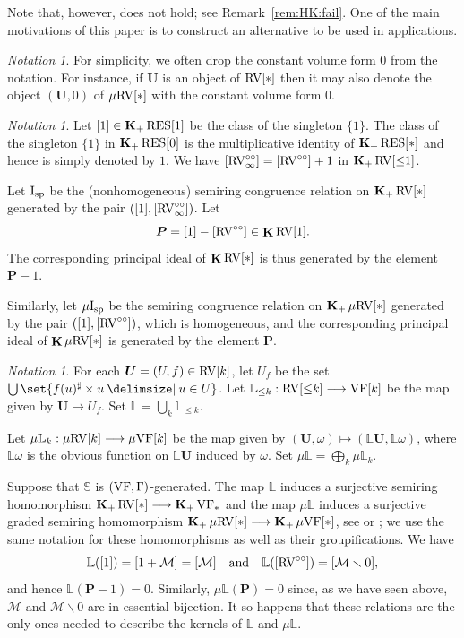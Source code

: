 \documentclass[12pt]{amsart}
\theoremstyle{plain}
\theoremstyle{definition}
\theoremstyle{remark}
\newtheorem{nota}[thm]{Notation}
\numberwithin{equation}{section}
\theoremstyle{plain}
\newcommand{\VF}{\textup{VF}}
\newcommand{\RV}{\textup{RV}}
\newcommand{\MM}{\mdl M}
\newcommand{\dand}{\quad \text{and} \quad}
\newcommand{\0}{\emptyset}
\newcommand{\mdl}[1]{\mathcal{#1}}  %
\newcommand{\bb}[1]{\mathbb{#1}}
\newcommand{\fun}{\longrightarrow}
\newcommand{\efun}{\longmapsto}
\newcommand{\mi}{\smallsetminus}
\providecommand\given{}
\newcommand\SetSymbol[1][]{%
\nonscript \: #1 \vert
\allowbreak
\nonscript\:
\mathopen{}}
\renewcommand\given{\SetSymbol[\delimsize]}
\newcommand{\mgVF}{{\mu} {\VF}}
\newcommand{\mgRV}{{\mu}{\RV}}
\newcommand{\RES}{\textup{RES}}
\newcommand{\isp}{\textup{I}_{\textup{sp}}}
\newcommand{\mgisp}{\mu \isp}
\newcommand{\mgL}{{\mu}{\bb L}}
\DeclareMathOperator{\gsk}{\mathbf{K}_+}
\DeclareMathOperator{\ggk}{\mathbf{K}}
\newcommand{\ccirc}{\circ \circ}
\begin{document}
Note that, however, \cite[Proposition~10.10(2)]{hrushovski:kazhdan:integration:vf} does not hold; see Remark~\ref{rem:HK:fail}. One of the main motivations of this paper is to construct an alternative to be used in applications.

\begin{nota}\label{drop:0}
For simplicity, we often drop the constant volume form $0$ from the notation. For instance, if $\bm U$ is an object of $\RV[*]$ then it may also denote the  object $(\bm U, 0)$ of $\mgRV[*]$ with the constant volume form $0$.
\end{nota}

\begin{nota}
Let $[1] \in \gsk \RES[1]$ be the class of the singleton $\{1\}$. The class of the singleton $\{1\}$ in $\gsk \RES[0]$ is the multiplicative identity of $\gsk \RES[*]$ and hence is simply denoted by $1$. We have $[\RV^{\circ\circ}_\infty] = [\RV^{\circ\circ}] + 1$ in $\gsk \RV[{\leq} 1]$.

Let $\isp$ be the (nonhomogeneous) semiring congruence relation on $\gsk \RV[*]$ generated by the pair $([1], [\RV^{\circ\circ}_\infty])$. Let
\[
\bm P = [1]-[\RV^{\ccirc}]  \in \ggk \RV[1].
\]
The corresponding principal ideal of $\ggk \RV[*]$ is thus generated by the element $\bm P - 1$.


Similarly, let $\mgisp$ be the  semiring congruence relation on $\gsk \mgRV[*]$ generated by the pair $([1], [\RV^{\circ\circ}])$, which is homogeneous, and the corresponding principal ideal of $\ggk \mgRV[*]$ is generated by the element $\bm P$.
\end{nota}


\begin{nota}\label{RVcat:tag}
For each  $\bm U = (U, f) \in  \RV[k]$, let $U_f$ be the set $\bigcup \set{f(u)^\sharp \times u \given u \in U}$. Let $\mathbb{L}_{\leq k}: \RV[{\leq}k] \fun \VF[k]$ be the map  given by $\bm U \efun U_f$. Set $\bb L = \bigcup_k \bb L_{\leq k}$.

Let $\mgL_k: \mgRV[k] \fun \mgVF[k]$ be the map given by $(\bm U, \omega) \efun (\bb L \bm U, \bb L \omega)$, where $\bb L \omega$ is the obvious function on $\bb L \bm U$ induced by $\omega$. Set $\mgL = \bigoplus_k \mgL_{k}$.
\end{nota}

Suppose that $\mathbb S$ is $(\VF,\Gamma)$-generated. The map $\bb L$ induces a surjective semiring homomorphism $\gsk \RV[*] \fun \gsk \VF_*$ and the map $\mgL$ induces a surjective graded semiring homomorphism $\gsk \mgRV[*] \fun \gsk \mgVF[*]$, see \cite[\S~4, \S~6]{hrushovski:kazhdan:integration:vf} or \cite[Corollaries~7.7, 10.6]{Yin:special:trans}; we use the same notation for these homomorphisms as well as their groupifications. We have
\[
\bb L ([1]) = [1 + \MM] = [\MM] \dand \bb L ([\RV^{\circ\circ}])=[\MM \mi 0],
\]
and hence $\bb L (\bm P - 1)=0$. Similarly, $\mgL (\bm P)=0$ since, as we have seen above, $\MM$ and $\MM \mi 0$ are in essential bijection. It so happens that these relations are the only ones needed to describe the kernels of $\bb L$ and $\mgL$.
\end{document}

